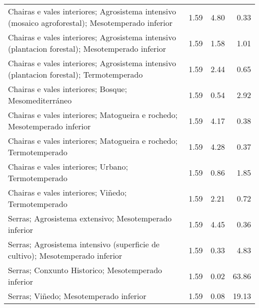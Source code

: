 \begin{table}[p]
\begin{tabular}{lrrr}
  Chairas e vales interiores; Agrosistema intensivo (mosaico agroforestal); Mesotemperado inferior & 1.59 & 4.80 & 0.33 \\ 
  Chairas e vales interiores; Agrosistema intensivo (plantacion forestal); Mesotemperado inferior & 1.59 & 1.58 & 1.01 \\ 
  Chairas e vales interiores; Agrosistema intensivo (plantacion forestal); Termotemperado & 1.59 & 2.44 & 0.65 \\ 
  Chairas e vales interiores; Bosque; Mesomediterráneo & 1.59 & 0.54 & 2.92 \\ 
  Chairas e vales interiores; Matogueira e rochedo; Mesotemperado inferior & 1.59 & 4.17 & 0.38 \\ 
  Chairas e vales interiores; Matogueira e rochedo; Termotemperado & 1.59 & 4.28 & 0.37 \\ 
  Chairas e vales interiores; Urbano; Termotemperado & 1.59 & 0.86 & 1.85 \\ 
  Chairas e vales interiores; Viñedo; Termotemperado & 1.59 & 2.21 & 0.72 \\ 
  Serras; Agrosistema extensivo; Mesotemperado inferior & 1.59 & 4.45 & 0.36 \\ 
  Serras; Agrosistema intensivo (superficie de cultivo); Mesotemperado inferior & 1.59 & 0.33 & 4.83 \\ 
  Serras; Conxunto Historico; Mesotemperado inferior & 1.59 & 0.02 & 63.86 \\ 
  Serras; Viñedo; Mesotemperado inferior & 1.59 & 0.08 & 19.13 \\ 
   \hline
\end{tabular}
\end{table}
